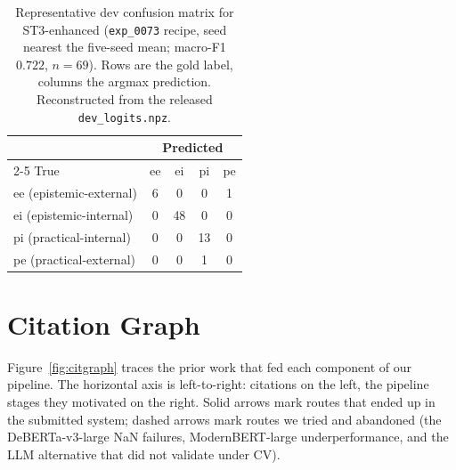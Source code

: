 \documentclass{ceurart}
\begin{document}
\begin{table}[h]
\centering
\small
\caption{Representative dev confusion matrix for ST3-enhanced (\texttt{exp\_0073}
recipe, seed nearest the five-seed mean; macro-F1 $0.722$, $n=69$). Rows are the
gold label, columns the argmax prediction. Reconstructed from the released
\texttt{dev\_logits.npz}.}
\label{tab:st3cm}
\begin{tabular}{lcccc}
\toprule
 & \multicolumn{4}{c}{Predicted} \\
\cmidrule(l){2-5}
True & \textsf{ee} & \textsf{ei} & \textsf{pi} & \textsf{pe} \\
\midrule
\textsf{ee} (epistemic-external) & 6 & 0 & 0 & 1 \\
\textsf{ei} (epistemic-internal) & 0 & 48 & 0 & 0 \\
\textsf{pi} (practical-internal) & 0 & 0 & 13 & 0 \\
\textsf{pe} (practical-external) & 0 & 0 & 1 & 0 \\
\bottomrule
\end{tabular}
\end{table}

\section{Citation Graph}
\label{app:citgraph}

Figure~\ref{fig:citgraph} traces the prior work that fed each component of
our pipeline. The horizontal axis is left-to-right: citations on the left,
the pipeline stages they motivated on the right. Solid arrows mark routes
that ended up in the submitted system; dashed arrows mark routes we tried
and abandoned (the DeBERTa-v3-large NaN failures, ModernBERT-large
underperformance, and the LLM alternative that did not validate under CV).
\end{document}
